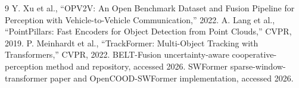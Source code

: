 \documentclass[11pt]{article}
\begin{document}
\begin{thebibliography}{9}
 Y. Xu et al., ``OPV2V: An Open Benchmark Dataset and Fusion Pipeline for Perception with Vehicle-to-Vehicle Communication,'' 2022.
 A. Lang et al., ``PointPillars: Fast Encoders for Object Detection from Point Clouds,'' CVPR, 2019.
 P. Meinhardt et al., ``TrackFormer: Multi-Object Tracking with Transformers,'' CVPR, 2022.
 BELT-Fusion uncertainty-aware cooperative-perception method and repository, accessed 2026.
 SWFormer sparse-window-transformer paper and OpenCOOD-SWFormer implementation, accessed 2026.
\end{thebibliography}
\end{document}
